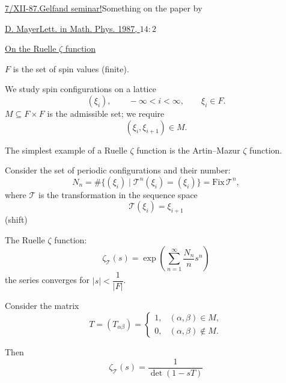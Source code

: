 \underline{7/XII-87.}\qquad \underline{Gelfand seminar!}\qquad Something on the paper by

\underline{D. Mayer}\qquad \underline{Lett. in Math. Phys. 1987, $14:2$}

\underline{On the Ruelle $\zeta$ function}

$F$ is the set of spin values (finite).

We study spin configurations on a lattice
\begin{equation*}
 (\xi_i),\qquad -\infty<i<\infty,\qquad \xi_i\in F.
\end{equation*}
$M\subseteq F\times F$ is the admissible set; we require
\begin{equation}
 (\xi_i,\xi_{i+1})\in M.
 \tag{1}
\end{equation}

The simplest example of a Ruelle $\zeta$ function is the Artin–Mazur $\zeta$ function.

Consider the set of periodic configurations and their number:
\begin{equation}
 N_n=\#\{(\xi_i)\mid\mathcal T^n(\xi_i)=(\xi_i)\}
 =\mathrm{Fix}\,\mathcal T^n,
 \tag{2}
\end{equation}
where $\mathcal T$ is the transformation in the sequence space
\begin{equation*}
 \mathcal T(\xi_i)=\xi_{i+1}
\end{equation*}
(shift)

The Ruelle $\zeta$ function:
\begin{equation}
 \zeta_{\mathcal T}(s)=\exp\left(\sum_{n=1}^{\infty}\frac{N_n}{n}s^n\right)
 \tag{3}
\end{equation}
the series converges for $|s|<\dfrac{1}{|F|}$.

Consider the matrix
\begin{equation}
 T=(T_{\alpha\beta})=
 \begin{cases}
 1,&(\alpha,\beta)\in M,\\
 0,&(\alpha,\beta)\notin M.
 \end{cases}
 \tag{4}
\end{equation}

Then
\begin{equation}
 \zeta_{\mathcal T}(s)=\frac{1}{\det(1-sT)}
 \tag{5}
\end{equation}

